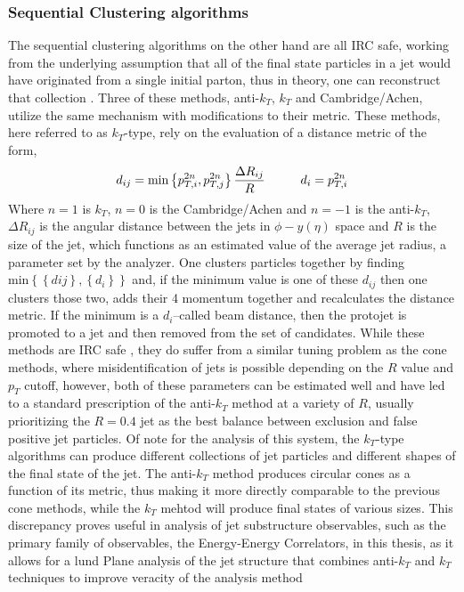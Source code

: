 	\subsubsection{Sequential Clustering algorithms}
	The sequential clustering algorithms on the other hand are all IRC safe, working from the underlying assumption that all of the final state particles in a jet would have originated from a single initial parton, thus in theory, one can reconstruct that collection \cite{Dokshitzer1997}.
	Three of these methods, anti-$k_{T}$, $k_{T}$ and Cambridge/Achen, utilize the same mechanism with modifications to their metric. 
	These methods, here referred to as $k_{T}$-type, rely on the evaluation of a distance metric of the form, 	\begin{equation}
		d_{ij} = \textrm{min}\left\{ p_{T, i}^{2n}, p_{T, j}^{2n} \right\} \frac{\Delta R_{ij}}{R} \hspace{1 cm} d_{i} = p_{T, i}^{2n} 
	\end{equation}
	Where $n=1$ is $k_{T}$, $n=0$ is the Cambridge/Achen and $n=-1$ is the anti-$k_{T}$, $\Delta R_{ij}$ is the angular distance between the jets in $\phi-y (\eta)$ space and $R$ is the size of the jet, which functions as an estimated value of the average jet radius, a parameter set by the analyzer.
	One clusters particles together by finding $\textrm{min}\left\{ \left\{ d{ij} \right\}, \left\{ d_{i} \right\} \right\}$ and, if the minimum value is one of these $d_{ij}$ then one clusters those two, adds their 4 momentum together and recalculates the distance metric. 
	If the minimum is a $d_{i}$--called beam distance, then the protojet is promoted to a jet and then removed from the set of candidates. 
	While these methods are IRC safe \cite{Dokshitzer1997}, they do suffer from a similar tuning problem as the cone methods, where misidentification of jets is possible depending on the $R$ value and $p_{T}$ cutoff, however, both of these parameters can be estimated well and have led to a standard prescription of the anti-$k_{T}$ method at a variety of $R$, usually prioritizing the $R=0.4$ jet as the best balance between exclusion and false positive jet particles. %
	Of note for the analysis of this system, the $k_{T}$-type algorithms can produce different collections of jet particles and different shapes of the final state of the jet. 
	The anti-$k_{T}$ method produces circular cones as a function of its metric, thus making it more directly comparable to the previous cone methods, while the $k_{T}$ mehtod will produce final states of various sizes.
	This discrepancy proves useful in analysis of jet substructure observables, such as the primary family of observables, the Energy-Energy Correlators, in this thesis, as it allows for a lund Plane analysis of the jet structure that combines anti-$k_T$ and $k_{T}$ techniques to improve veracity of the analysis method %


